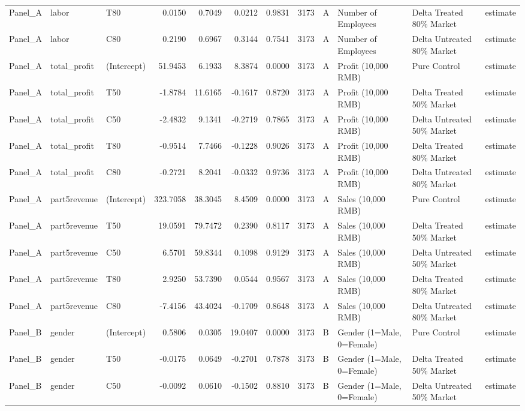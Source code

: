 \begin{table}
\begin{tabular}[t]{lllrrrrrllll}
Panel\_A & labor & T80 & 0.0150 & 0.7049 & 0.0212 & 0.9831 & 3173 & A & Number of Employees & Delta Treated 80\% Market & estimate\\
Panel\_A & labor & C80 & 0.2190 & 0.6967 & 0.3144 & 0.7541 & 3173 & A & Number of Employees & Delta Untreated 80\% Market & estimate\\
\addlinespace
Panel\_A & total\_profit & (Intercept) & 51.9453 & 6.1933 & 8.3874 & 0.0000 & 3173 & A & Profit (10,000 RMB) & Pure Control & estimate\\
Panel\_A & total\_profit & T50 & -1.8784 & 11.6165 & -0.1617 & 0.8720 & 3173 & A & Profit (10,000 RMB) & Delta Treated 50\% Market & estimate\\
Panel\_A & total\_profit & C50 & -2.4832 & 9.1341 & -0.2719 & 0.7865 & 3173 & A & Profit (10,000 RMB) & Delta Untreated 50\% Market & estimate\\
Panel\_A & total\_profit & T80 & -0.9514 & 7.7466 & -0.1228 & 0.9026 & 3173 & A & Profit (10,000 RMB) & Delta Treated 80\% Market & estimate\\
Panel\_A & total\_profit & C80 & -0.2721 & 8.2041 & -0.0332 & 0.9736 & 3173 & A & Profit (10,000 RMB) & Delta Untreated 80\% Market & estimate\\
\addlinespace
Panel\_A & part5revenue & (Intercept) & 323.7058 & 38.3045 & 8.4509 & 0.0000 & 3173 & A & Sales (10,000 RMB) & Pure Control & estimate\\
Panel\_A & part5revenue & T50 & 19.0591 & 79.7472 & 0.2390 & 0.8117 & 3173 & A & Sales (10,000 RMB) & Delta Treated 50\% Market & estimate\\
Panel\_A & part5revenue & C50 & 6.5701 & 59.8344 & 0.1098 & 0.9129 & 3173 & A & Sales (10,000 RMB) & Delta Untreated 50\% Market & estimate\\
Panel\_A & part5revenue & T80 & 2.9250 & 53.7390 & 0.0544 & 0.9567 & 3173 & A & Sales (10,000 RMB) & Delta Treated 80\% Market & estimate\\
Panel\_A & part5revenue & C80 & -7.4156 & 43.4024 & -0.1709 & 0.8648 & 3173 & A & Sales (10,000 RMB) & Delta Untreated 80\% Market & estimate\\
\addlinespace
Panel\_B & gender & (Intercept) & 0.5806 & 0.0305 & 19.0407 & 0.0000 & 3173 & B & Gender (1=Male, 0=Female) & Pure Control & estimate\\
Panel\_B & gender & T50 & -0.0175 & 0.0649 & -0.2701 & 0.7878 & 3173 & B & Gender (1=Male, 0=Female) & Delta Treated 50\% Market & estimate\\
Panel\_B & gender & C50 & -0.0092 & 0.0610 & -0.1502 & 0.8810 & 3173 & B & Gender (1=Male, 0=Female) & Delta Untreated 50\% Market & estimate\\

\end{tabular}
\end{table}
